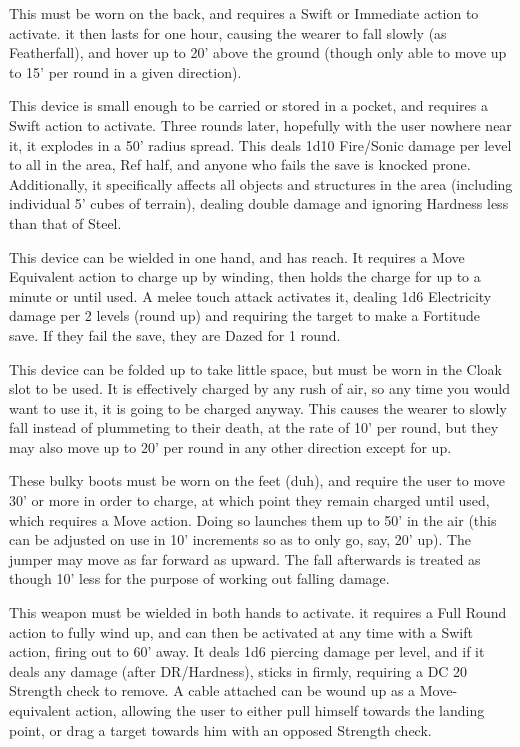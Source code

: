 {This must be worn on the back, and requires a Swift or Immediate action to activate. it then lasts for one hour, causing the wearer to fall slowly (as Featherfall), and hover up to 20' above the ground (though only able to move up to 15' per round in a given direction).}

{This device is small enough to be carried or stored in a pocket, and requires a Swift action to activate. Three rounds later, hopefully with the user nowhere near it, it explodes in a 50' radius spread. This deals 1d10 Fire/Sonic damage per level to all in the area, Ref half, and anyone who fails the save is knocked prone. Additionally, it specifically affects all objects and structures in the area (including individual 5' cubes of terrain), dealing double damage and ignoring Hardness less than that of Steel.}

{This device can be wielded in one hand, and has reach. It requires a Move Equivalent action to charge up by winding, then holds the charge for up to a minute or until used. A melee touch attack activates it, dealing 1d6 Electricity damage per 2 levels (round up) and requiring the target to make a Fortitude save. If they fail the save, they are Dazed for 1 round.}

{This device can be folded up to take little space, but must be worn in the Cloak slot to be used. It is effectively charged by any rush of air, so any time you would want to use it, it is going to be charged anyway. This causes the wearer to slowly fall instead of plummeting to their death, at the rate of 10' per round, but they may also move up to 20' per round in any other direction except for up.}

{These bulky boots must be worn on the feet (duh), and require the user to move 30' or more in order to charge, at which point they remain charged until used, which requires a Move action. Doing so launches them up to 50' in the air (this can be adjusted on use in 10' increments so as to only go, say, 20' up). The jumper may move as far forward as upward. The fall afterwards is treated as though 10' less for the purpose of working out falling damage.}

{This weapon must be wielded in both hands to activate. it requires a Full Round action to fully wind up, and can then be activated at any time with a Swift action, firing out to 60' away. It deals 1d6 piercing damage per level, and if it deals any damage (after DR/Hardness), sticks in firmly, requiring a DC 20 Strength check to remove. A cable attached can be wound up as a Move-equivalent action, allowing the user to either pull himself towards the landing point, or drag a target towards him with an opposed Strength check.}

